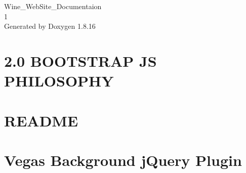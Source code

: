 \let\mypdfximage\pdfximage\def\pdfximage{\immediate\mypdfximage}\documentclass[twoside]{book}
\newcommand{\+}{\discretionary{\mbox{\scriptsize$\hookleftarrow$}}{}{}}
\newcommand{\clearemptydoublepage}{%
  \newpage{\pagestyle{empty}\cleardoublepage}%
}
\begin{document}
\hypersetup{pageanchor=false,
             bookmarksnumbered=true,
             pdfencoding=unicode
            }
\begin{titlepage}
\vspace*{7cm}
\begin{center}%
{\Large Wine\+\_\+\+Web\+Site\+\_\+\+Documentaion \\[1ex]\large 1 }\\
\vspace*{1cm}
{\large Generated by Doxygen 1.8.16}\\
\end{center}
\end{titlepage}
\clearemptydoublepage
{}
\tableofcontents
\clearemptydoublepage
{}
\hypersetup{pageanchor=true}

\chapter{2.0 B\+O\+O\+T\+S\+T\+R\+AP JS P\+H\+I\+L\+O\+S\+O\+P\+HY}
\label{md__c_1__users__miss__louc__documents__c_p_n_v__depot__git_kraken__proj__wine_src_view_content_d4492f3c72384bcb605454162d5eab969}

\chapter{R\+E\+A\+D\+ME}
\label{md__c_1__users__miss__louc__documents__c_p_n_v__depot__git_kraken__proj__wine_src_view_content_scripts_fontawesome__r_e_a_d_m_e}

\chapter{Vegas Background j\+Query Plugin}
\label{md__c_1__users__miss__louc__documents__c_p_n_v__depot__git_kraken__proj__wine_src_view_content_scripts_vegas__r_e_a_d_m_e}

\end{document}
